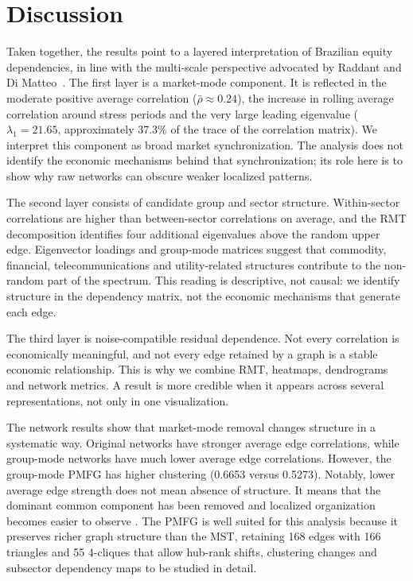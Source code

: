 \section{Discussion}
\label{sec:discussion}

Taken together, the results point to a layered interpretation of Brazilian equity dependencies, in line with the multi-scale perspective advocated by Raddant and Di Matteo~\cite{raddant_dimatteo_2023}. The first layer is a market-mode component. It is reflected in the moderate positive average correlation ($\bar{\rho}\approx0.24$), the increase in rolling average correlation around stress periods and the very large leading eigenvalue ($\lambda_1=21.65$, approximately 37.3\% of the trace of the correlation matrix). We interpret this component as broad market synchronization. The analysis does not identify the economic mechanisms behind that synchronization; its role here is to show why raw networks can obscure weaker localized patterns.

The second layer consists of candidate group and sector structure. Within-sector correlations are higher than between-sector correlations on average, and the RMT decomposition identifies four additional eigenvalues above the random upper edge. Eigenvector loadings and group-mode matrices suggest that commodity, financial, telecommunications and utility-related structures contribute to the non-random part of the spectrum. This reading is descriptive, not causal: we identify structure in the dependency matrix, not the economic mechanisms that generate each edge.

The third layer is noise-compatible residual dependence. Not every correlation is economically meaningful, and not every edge retained by a graph is a stable economic relationship. This is why we combine RMT, heatmaps, dendrograms and network metrics. A result is more credible when it appears across several representations, not only in one visualization.

The network results show that market-mode removal changes structure in a systematic way. Original networks have stronger average edge correlations, while group-mode networks have much lower average edge correlations. However, the group-mode PMFG has higher clustering (0.6653 versus 0.5273). Notably, lower average edge strength does not mean absence of structure. It means that the dominant common component has been removed and localized organization becomes easier to observe \cite{tumminello_2005_tool,tumminello_2010_correlation}. The PMFG is well suited for this analysis because it preserves richer graph structure than the MST, retaining 168 edges with 166 triangles and 55 4-cliques that allow hub-rank shifts, clustering changes and subsector dependency maps to be studied in detail.

